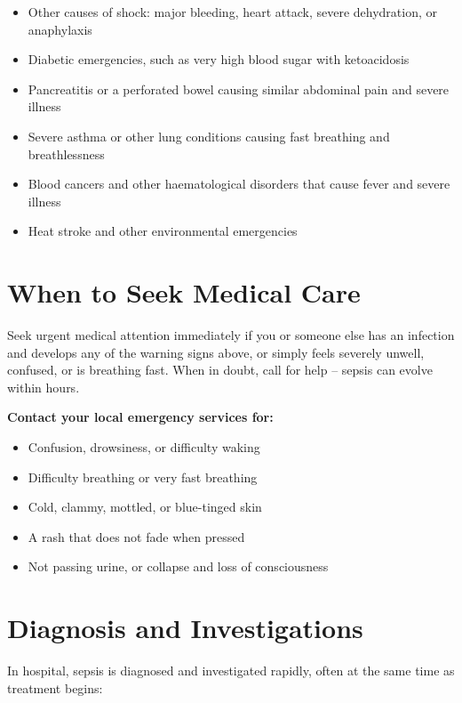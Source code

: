 \begin{itemize}
    \item Other causes of shock: major bleeding, heart attack, severe dehydration, or anaphylaxis
    \item Diabetic emergencies, such as very high blood sugar with ketoacidosis
    \item Pancreatitis or a perforated bowel causing similar abdominal pain and severe illness
    \item Severe asthma or other lung conditions causing fast breathing and breathlessness
    \item Blood cancers and other haematological disorders that cause fever and severe illness
    \item Heat stroke and other environmental emergencies
\end{itemize}

\section*{When to Seek Medical Care}
Seek urgent medical attention immediately if you or someone else has an infection and develops any of the warning signs above, or simply feels severely unwell, confused, or is breathing fast. When in doubt, call for help -- sepsis can evolve within hours.

\textbf{Contact your local emergency services for:}
\begin{itemize}
    \item Confusion, drowsiness, or difficulty waking
    \item Difficulty breathing or very fast breathing
    \item Cold, clammy, mottled, or blue-tinged skin
    \item A rash that does not fade when pressed
    \item Not passing urine, or collapse and loss of consciousness
\end{itemize}

\section*{Diagnosis and Investigations}
In hospital, sepsis is diagnosed and investigated rapidly, often at the same time as treatment begins:

